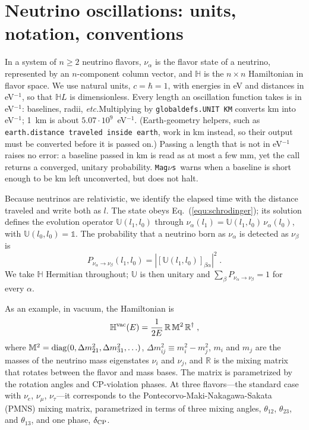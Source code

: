 \documentclass[final,5p,times,twocolumn,sort,compress]{elsarticle}
\makeatletter
\newcommand{\etc}{{\it etc.}}
\newcommand{\eq}{Eq.}
\DeclareRobustCommand{\_}{%
  \ifmmode\nfss@text{\textunderscore}\else\textunderscore\allowbreak\fi}
\newcommand{\equ}[1]{\eq~(\ref{equ:#1})}
\newcommand{\magnus}{{\tt Mag}\ensuremath{\nu}{\tt s}}
\makeatother
\begin{document}
\section{Neutrino oscillations: units, notation, conventions}
\label{sec:recap}

In a system of $n \geq 2$ neutrino flavors, $\nu_\alpha$ is the flavor state of a neutrino, represented by an $n$-component column vector, and $\mathbb{H}$ is the $n \times n$ Hamiltonian in flavor space. We use natural units, $c = \hbar = 1$, with energies in eV and distances in eV$^{-1}$, so that $\mathbb{H}L$ is dimensionless. Every length an oscillation function takes is in eV$^{-1}$: baselines, radii, \etc Multiplying by {\tt globaldefs.UNIT\_KM} converts km into eV$^{-1}$; 1~km is about $5.07 \cdot 10^{9}$~eV$^{-1}$. (Earth-geometry helpers, such as {\tt earth.distance\_traveled\_inside\_earth}, work in km instead, so their output must be converted before it is passed on.) Passing a length that is not in eV$^{-1}$ raises no error: a baseline passed in km is read as at most a few mm, yet the call returns a converged, unitary probability. \magnus\ warns when a baseline is short enough to be km left unconverted, but does not halt.

Because neutrinos are relativistic, we identify the elapsed time with the distance traveled and write both as $l$. The state obeys \equ{schrodinger}; its solution defines the evolution operator $\mathbb{U}(l_1, l_0)$  through $\nu_\alpha(l_1) = \mathbb{U}(l_1,l_0)\, \nu_\alpha(l_0)$, with $\mathbb{U}(l_0,l_0) = \mathbb{1}$. The probability that a neutrino born as $\nu_\alpha$ is detected as $\nu_\beta$ is
\begin{equation}
 \label{equ:probability}
 P_{\nu_\alpha \to \nu_\beta}(l_1, l_0)
 =
 \left\lvert \left[\mathbb{U}(l_1,l_0)\right]_{\beta\alpha} \right\rvert^2 \;.
\end{equation}
We take $\mathbb{H}$ Hermitian throughout; $\mathbb{U}$ is then unitary and $\sum_\beta P_{\nu_\alpha \to \nu_\beta} = 1$ for every $\alpha$.

As an example, in vacuum, the Hamiltonian is
\begin{equation}
 \label{equ:h_vacuum}
 \mathbb{H}^{\rm vac}(E)
 =
 \frac{1}{2E}\, \mathbb{R}\, \mathbb{M}^2\, \mathbb{R}^\dagger \;,
\end{equation}
where $\mathbb{M}^2 = {\rm diag}(0, \Delta m^2_{21}, \Delta m^2_{31}, \ldots)$, $\Delta m^2_{ij} \equiv m_i^2 - m_j^2$, $m_i$ and $m_j$ are the masses of the neutrino mass eigenstates $\nu_i$ and $\nu_j$, and $\mathbb{R}$ is the mixing matrix that rotates between the flavor and mass bases.  The matrix is parametrized by the rotation angles and CP-violation phases. At three flavors---the standard case with $\nu_e$, $\nu_\mu$, $\nu_\tau$---it corresponds to the Pontecorvo-Maki-Nakagawa-Sakata (PMNS) mixing matrix, parametrized in terms of three mixing angles, $\theta_{12}$, $\theta_{23}$, and $\theta_{13}$, and one phase, $\delta_{\rm CP}$. 
\end{document}

